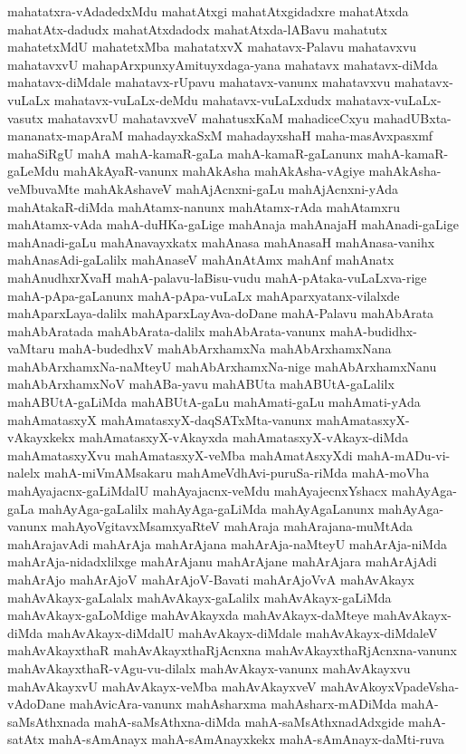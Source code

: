 {mahatatxra-vAdadedxMdu
mahatAtxgi
mahatAtxgidadxre
mahatAtxda
mahatAtx-dadudx
mahatAtxdadodx
mahatAtxda-lABavu
mahatutx
mahatetxMdU
mahatetxMba
mahatatxvX
mahatavx-Palavu
mahatavxvu
mahatavxvU
mahapArxpunxyAmituyxdaga-yana
mahatavx
mahatavx-diMda
mahatavx-diMdale
mahatavx-rUpavu
mahatavx-vanunx
mahatavxvu
mahatavx-vuLaLx
mahatavx-vuLaLx-deMdu
mahatavx-vuLaLxdudx
mahatavx-vuLaLx-vasutx
mahatavxvU
mahatavxveV
mahatusxKaM
mahadiceCxyu
mahadUBxta-mananatx-mapAraM
mahadayxkaSxM
mahadayxshaH
maha-masAvxpasxmf
mahaSiRgU
mahA
mahA-kamaR-gaLa
mahA-kamaR-gaLanunx
mahA-kamaR-gaLeMdu
mahAkAyaR-vanunx
mahAkAsha
mahAkAsha-vAgiye
mahAkAsha-veMbuvaMte
mahAkAshaveV
mahAjAcnxni-gaLu
mahAjAcnxni-yAda
mahAtakaR-diMda
mahAtamx-nanunx
mahAtamx-rAda
mahAtamxru
mahAtamx-vAda
mahA-duHKa-gaLige
mahAnaja
mahAnajaH
mahAnadi-gaLige
mahAnadi-gaLu
mahAnavayxkatx
mahAnasa
mahAnasaH
mahAnasa-vanihx
mahAnasAdi-gaLalilx
mahAnaseV
mahAnAtAmx
mahAnf
mahAnatx
mahAnudhxrXvaH
mahA-palavu-laBisu-vudu
mahA-pAtaka-vuLaLxva-rige
mahA-pApa-gaLanunx
mahA-pApa-vuLaLx
mahAparxyatanx-vilalxde
mahAparxLaya-dalilx
mahAparxLayAva-doDane
mahA-Palavu
mahAbArata
mahAbAratada
mahAbArata-dalilx
mahAbArata-vanunx
mahA-budidhx-vaMtaru
mahA-budedhxV
mahAbArxhamxNa
mahAbArxhamxNana
mahAbArxhamxNa-naMteyU
mahAbArxhamxNa-nige
mahAbArxhamxNanu
mahAbArxhamxNoV
mahABa-yavu
mahABUta
mahABUtA-gaLalilx
mahABUtA-gaLiMda
mahABUtA-gaLu
mahAmati-gaLu
mahAmati-yAda
mahAmatasxyX
mahAmatasxyX-daqSATxMta-vanunx
mahAmatasxyX-vAkayxkekx
mahAmatasxyX-vAkayxda
mahAmatasxyX-vAkayx-diMda
mahAmatasxyXvu
mahAmatasxyX-veMba
mahAmatAsxyXdi
mahA-mADu-vi-nalelx
mahA-miVmAMsakaru
mahAmeVdhAvi-puruSa-riMda
mahA-moVha
mahAyajacnx-gaLiMdalU
mahAyajacnx-veMdu
mahAyajecnxYshacx
mahAyAga-gaLa
mahAyAga-gaLalilx
mahAyAga-gaLiMda
mahAyAgaLanunx
mahAyAga-vanunx
mahAyoVgitavxMsamxyaRteV
mahAraja
mahArajana-muMtAda
mahArajavAdi
mahArAja
mahArAjana
mahArAja-naMteyU
mahArAja-niMda
mahArAja-nidadxlilxge
mahArAjanu
mahArAjane
mahArAjara
mahArAjAdi
mahArAjo
mahArAjoV
mahArAjoV-Bavati
mahArAjoVvA
mahAvAkayx
mahAvAkayx-gaLalalx
mahAvAkayx-gaLalilx
mahAvAkayx-gaLiMda
mahAvAkayx-gaLoMdige
mahAvAkayxda
mahAvAkayx-daMteye
mahAvAkayx-diMda
mahAvAkayx-diMdalU
mahAvAkayx-diMdale
mahAvAkayx-diMdaleV
mahAvAkayxthaR
mahAvAkayxthaRjAcnxna
mahAvAkayxthaRjAcnxna-vanunx
mahAvAkayxthaR-vAgu-vu-dilalx
mahAvAkayx-vanunx
mahAvAkayxvu
mahAvAkayxvU
mahAvAkayx-veMba
mahAvAkayxveV
mahAvAkoyxVpadeVsha-vAdoDane
mahAvicAra-vanunx
mahAsharxma
mahAsharx-mADiMda
mahA-saMsAthxnada
mahA-saMsAthxna-diMda
mahA-saMsAthxnadAdxgide
mahA-satAtx
mahA-sAmAnayx
mahA-sAmAnayxkekx
mahA-sAmAnayx-daMti-ruva
}
